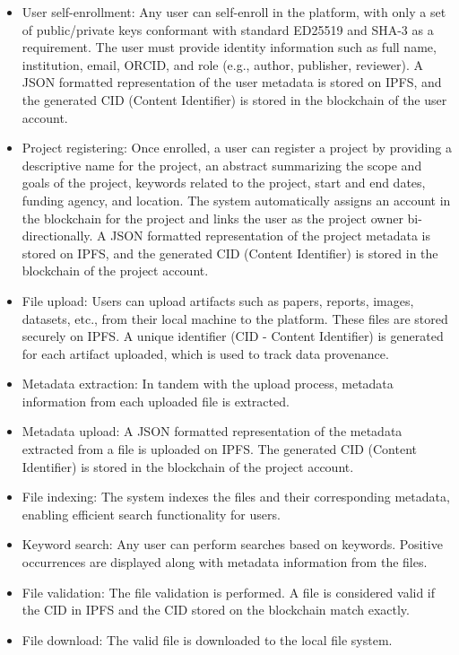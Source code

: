 \documentclass{article}
\begin{document}
\begin{itemize}
      \item User self-enrollment:
            \indent Any user can self-enroll in the platform, with only a set of public/private keys conformant with standard ED25519 and SHA-3 as a requirement. The user must provide identity information such as full name, institution, email, ORCID, and role (e.g., author, publisher, reviewer). A JSON formatted representation of the user metadata is stored on IPFS, and the generated CID (Content Identifier) is stored in the blockchain of the user account.

      \item Project registering:
            \indent Once enrolled, a user can register a project by providing a descriptive name for the project, an abstract summarizing the scope and goals of the project, keywords related to the project, start and end dates, funding agency, and location. The system automatically assigns an account in the blockchain for the project and links the user as the project owner bi-directionally. A JSON formatted representation of the project metadata is stored on IPFS, and the generated CID (Content Identifier) is stored in the blockchain of the project account.

      \item File upload:
            \indent Users can upload artifacts such as papers, reports, images, datasets, etc., from their local machine to the platform. These files are stored securely on IPFS. A unique identifier (CID - Content Identifier) is generated for each artifact uploaded, which is used to track data provenance.

      \item Metadata extraction:
            \indent In tandem with the upload process, metadata information from each uploaded file is extracted.

      \item Metadata upload:
            \indent A JSON formatted representation of the metadata extracted from a file is uploaded on IPFS. The generated CID (Content Identifier) is stored in the blockchain of the project account.

      \item File indexing:
            \indent The system indexes the files and their corresponding metadata, enabling efficient search functionality for users.

      \item Keyword search:
            \indent Any user can perform searches based on keywords. Positive occurrences are displayed along with metadata information from the files.

      \item File validation:
            \indent The file validation is performed. A file is considered valid if the CID in IPFS and the CID stored on the blockchain match exactly.

      \item File download:
            \indent The valid file is downloaded to the local file system.
\end{itemize}
\end{document}
